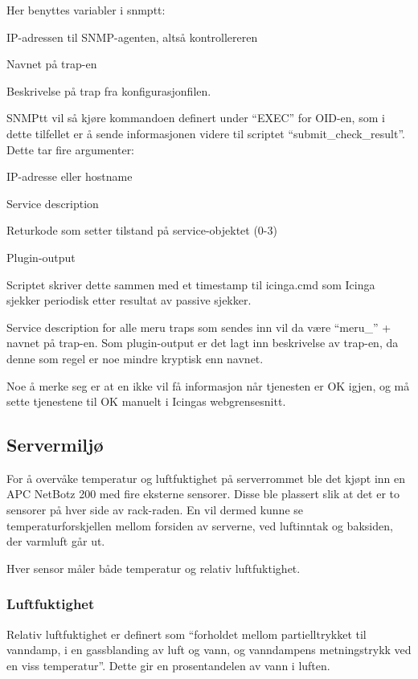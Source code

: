 Her benyttes variabler i snmptt\cite{snmptrans}:
\begin{itemize*}
	\item IP-adressen til SNMP-agenten, altså kontrollereren
	\item Navnet på trap-en
	\item Beskrivelse på trap fra konfigurasjonfilen.
\end{itemize*}

SNMPtt vil så kjøre kommandoen definert under ``EXEC'' for OID-en, som i dette tilfellet er å sende informasjonen videre til scriptet ``submit\_check\_result''. Dette tar fire argumenter:

\begin{itemize*}
	\item IP-adresse eller hostname 
	\item Service description
	\item Returkode som setter tilstand på service-objektet (0-3)
	\item Plugin-output
\end{itemize*}
Scriptet skriver dette sammen med et timestamp til icinga.cmd som Icinga sjekker periodisk etter resultat av passive sjekker.

Service description for alle meru traps som sendes inn vil da være ``meru\_'' + navnet på trap-en. Som plugin-output er det lagt inn beskrivelse av trap-en, da denne som regel er noe mindre kryptisk enn navnet.

Noe å merke seg er at en ikke vil få informasjon når tjenesten er OK igjen, og må sette tjenestene til OK manuelt i Icingas webgrensesnitt.

\subsection{Servermiljø}
For å overvåke temperatur og luftfuktighet på serverrommet ble det kjøpt inn en APC NetBotz 200 med fire eksterne sensorer. Disse ble plassert slik at det er to sensorer på hver side av rack-raden. En vil dermed kunne se temperaturforskjellen mellom forsiden av serverne, ved luftinntak og baksiden, der varmluft går ut.

Hver sensor måler både temperatur og relativ luftfuktighet.

\subsubsection{Luftfuktighet}
Relativ luftfuktighet er definert som ``forholdet mellom partielltrykket til vanndamp, i en gassblanding av luft og vann, og vanndampens metningstrykk ved en viss temperatur''. Dette gir en prosentandelen av vann i luften\cite{wiki:luftfuktighet}. 

